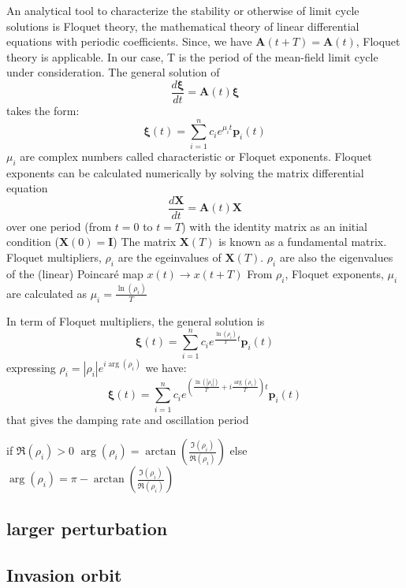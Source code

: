 \documentclass[12pt]{article}
\begin{document}
An analytical tool to characterize the stability or otherwise of limit cycle solutions is Floquet theory, the mathematical theory of linear differential equations with periodic coefficients. Since, we have $\mathbf{A}(t+T)= \mathbf{A}(t)$, Floquet theory is applicable. In our case, T is the period of the mean-field limit cycle under consideration.
The general solution of
$$\frac{d\mathbf{\xi}}{dt} = \mathbf{A}(t) \mathbf{\xi}$$
takes the form:
$$\mathbf{\xi}(t) = \sum_{i=1}^n c_i e^{\mu_i t} \mathbf{p}_i(t)$$
$\mu_i$ are complex numbers called characteristic or Floquet exponents.
Floquet exponents can be calculated numerically by solving the matrix differential equation
$$\frac{d\mathbf{X}}{dt} = \mathbf{A}(t) \mathbf{X}$$
over one period (from $t=0$ to $t=T$) with the identity matrix as an initial condition ($\mathbf{X}(0)=\mathbf{I}$)
The matrix $\mathbf{X}(T)$ is known as a fundamental matrix.
Floquet multipliers, $\rho_i$ are the egeinvalues of $\mathbf{X}(T)$. 
$\rho_i$ are also the eigenvalues of the (linear) Poincaré map $x(t) \rightarrow x(t+T)$
From $\rho_i$, Floquet exponents, $\mu_i$ are calculated as $\mu_i= \frac{\ln(\rho_i)}{T}$

In term of Floquet multipliers, the general solution is
$$\mathbf{\xi}(t) = \sum_{i=1}^n c_i e^{\frac{\ln(\rho_i)}{T} t} \mathbf{p}_i(t)$$
expressing $\rho_i= |\rho_i|e^{i \arg(\rho_i)}$ we have:
$$\mathbf{\xi}(t) = \sum_{i=1}^n c_i e^{(\frac{\ln(|\rho_i|)}{T}+ i \frac{\arg(\rho_i)}{T}) t} \mathbf{p}_i(t)$$
that gives the damping rate and oscillation period

if $\Re(\rho_i)>0$ $\arg(\rho_i)= \arctan(\frac{\Im(\rho_i)}{\Re(\rho_i)})$
else $\arg(\rho_i)= \pi- \arctan(\frac{\Im(\rho_i)}{\Re(\rho_i)})$

\subsection{larger perturbation}

\subsection{Invasion orbit}
\end{document}
